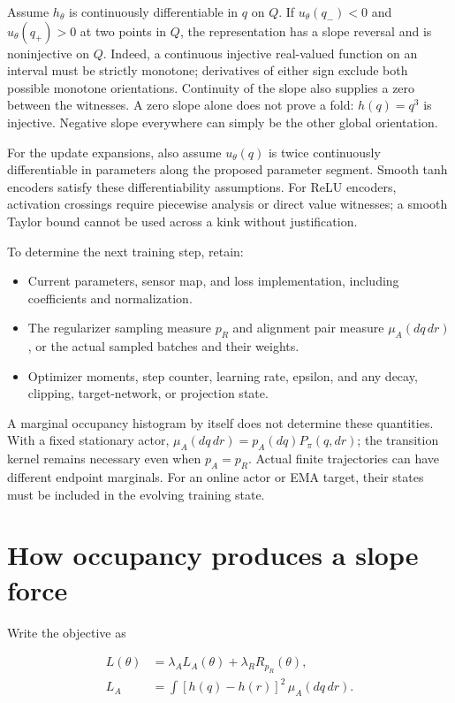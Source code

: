\documentclass[11pt]{article}
\providecommand{\tightlist}{\setlength{\itemsep}{3pt}\setlength{\parskip}{0pt}}
\begin{document}
Assume \(h_\theta\) is continuously differentiable in \(q\) on \(Q\). If
\(u_\theta(q_- )<0\) and \(u_\theta(q_+)>0\) at two points in \(Q\), the
representation has a slope reversal and is noninjective on \(Q\).
Indeed, a continuous injective real-valued function on an interval must
be strictly monotone; derivatives of either sign exclude both possible
monotone orientations. Continuity of the slope also supplies a zero
between the witnesses. A zero slope alone does not prove a fold:
\(h(q)=q^3\) is injective. Negative slope everywhere can simply be the
other global orientation.

For the update expansions, also assume \(u_\theta(q)\) is twice
continuously differentiable in parameters along the proposed parameter
segment. Smooth tanh encoders satisfy these differentiability
assumptions. For ReLU encoders, activation crossings require piecewise
analysis or direct value witnesses; a smooth Taylor bound cannot be used
across a kink without justification.

To determine the next training step, retain:

\begin{itemize}
\tightlist
\item
  Current parameters, sensor map, and loss implementation, including
  coefficients and normalization.
\item
  The regularizer sampling measure \(p_R\) and alignment pair measure
  \(\mu_A(dq\,dr)\), or the actual sampled batches and their weights.
\item
  Optimizer moments, step counter, learning rate, epsilon, and any
  decay, clipping, target-network, or projection state.
\end{itemize}

A marginal occupancy histogram by itself does not determine these
quantities. With a fixed stationary actor,
\(\mu_A(dq\,dr)=p_A(dq)P_\pi(q,dr)\); the transition kernel remains
necessary even when \(p_A=p_R\). Actual finite trajectories can have
different endpoint marginals. For an online actor or EMA target, their
states must be included in the evolving training state.

\section{How occupancy produces a slope
force}\label{how-occupancy-produces-a-slope-force}

Write the objective as

\begin{equation}\label{eq:objective}
\begin{aligned}
L(\theta)&=\lambda_A L_A(\theta)+\lambda_R R_{p_R}(\theta),\\
L_A&=\int[h(q)-h(r)]^2\,\mu_A(dq\,dr).\end{aligned}
\end{equation}
\end{document}
